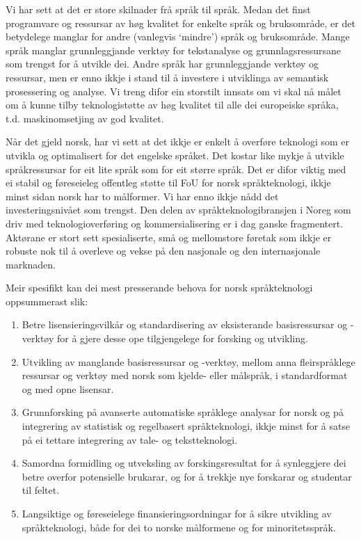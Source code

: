 \begin{multicols}{2}
Vi har sett at det er store skilnader frå språk til språk. Medan det finst programvare og ressursar av høg kvalitet for enkelte språk og bruksområde, er det betydelege manglar for andre (vanlegvis `mindre') språk og bruksområde. Mange språk manglar grunnleggjande verktøy for tekstanalyse og grunnlagsressursane som trengst for å utvikle dei. Andre språk har grunnleggjande verktøy og ressursar, men er enno ikkje i stand til å investere i utviklinga av semantisk prosessering og analyse. Vi treng difor ein storstilt innsats om vi skal nå målet om å kunne tilby teknologistøtte av høg kvalitet til alle dei europeiske språka, t.d. maskinomsetjing av god kvalitet.

Når det gjeld norsk, har vi sett at det ikkje er enkelt å overføre teknologi som er utvikla og optimalisert for det engelske språket. 
Det kostar like mykje å utvikle språkressursar for eit lite språk som for eit større språk. Det er difor viktig med ei stabil og føreseieleg offentleg støtte til FoU for norsk språkteknologi, ikkje minst sidan norsk har to målformer. 
Vi har enno ikkje nådd det investeringsnivået som trengst. Den delen av språkteknologibransjen i Noreg som driv med teknologioverføring og kommersialisering er i dag ganske fragmentert. Aktørane er stort sett spesialiserte, små og mellomstore føretak som ikkje er robuste nok til å overleve og vekse på den nasjonale og den internasjonale marknaden.

Meir spesifikt kan dei mest presserande behova for norsk språkteknologi oppsummerast slik:
\begin{enumerate}
\item Betre lisensieringsvilkår og standardisering av eksisterande basisressursar og -verktøy for å gjere desse ope tilgjengelege for forsking og utvikling.
\item Utvikling av manglande basisressursar og -verktøy, mellom anna  fleirspråklege ressursar og verktøy med norsk som kjelde- eller målspråk, i standardformat og med opne lisensar.
\item Grunnforsking på avanserte automatiske språklege analysar for norsk og på integrering av statistisk og regelbasert språkteknologi, ikkje minst for å satse på ei tettare integrering av tale- og tekstteknologi.
\item Samordna formidling og utveksling av forskingsresultat for å synleggjere dei betre overfor potensielle brukarar, og for å trekkje nye forskarar og studentar til feltet.
\item Langsiktige og føreseielege finansieringsordningar for å sikre utvikling av språkteknologi, både for dei to norske målformene og for minoritetsspråk.
\end{enumerate}


\end{multicols}
